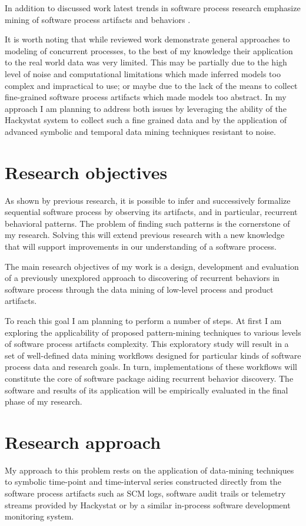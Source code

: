 \documentclass{sig-alternate}
\begin{document}
In addition to discussed work latest trends in software process research emphasize mining of software process artifacts and behaviors \cite{citeulike:2678511} \cite{citeulike:5043664} \cite{citeulike:5112229}. 

It is worth noting that while reviewed work demonstrate general approaches to modeling of concurrent processes, to the best of my knowledge their application to the real world data was very limited. This may be partially due to the high level of noise and computational limitations which made inferred models too complex and impractical to use; or maybe due to the lack of the means to collect fine-grained software process artifacts which made models too abstract. In my approach I am planning to address both issues by leveraging the ability of the Hackystat system \cite{citeulike:4041809} to collect such a fine grained data and by the application of advanced symbolic and temporal data mining techniques resistant to noise.

\section{Research objectives}
As shown by previous research, it is possible to infer and successively formalize sequential software process by observing its artifacts, and in particular, recurrent behavioral patterns. The problem of finding such patterns is the cornerstone of my research. Solving this will extend previous research with a new knowledge that will support improvements in our understanding of a software process.

The main research objectives of my work is a design, development and evaluation of a previously unexplored approach to discovering of recurrent behaviors in software process through the data mining of low-level process and product artifacts. 

To reach this goal I am planning to perform a number of steps. At first I am exploring the applicability of proposed pattern-mining techniques to various levels of software process artifacts complexity. This exploratory study will result in a set of well-defined data mining workflows designed for particular kinds of software process data and research goals. In turn, implementations of these workflows will constitute the core of software package aiding recurrent behavior discovery. The software and results of its application will be empirically evaluated in the final phase of my research.

\section{Research approach}
My approach to this problem rests on the application of data-mining techniques to symbolic time-point and time-interval series constructed directly from the software process artifacts such as SCM logs, software audit trails or telemetry streams provided by Hackystat or by a similar in-process software development monitoring system.
\end{document}
